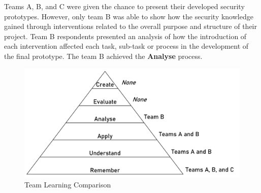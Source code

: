 \documentclass[runningheads]{llncs}
\begin{document}
Teams A, B, and C were given the chance to present their developed security prototypes. However, only team B was able to show how the security knowledge gained through interventions related to the overall purpose and structure of their project. Team B respondents presented an analysis of how the introduction of each intervention affected each task, sub-task or process in the development of the final prototype. The team B achieved the \textbf{Analyse} process. 

\begin{figure}[h]
  \centering
  \includegraphics[width=1\linewidth]{Bloomsoutput.pdf}
  \caption{Team Learning Comparison} \label{tab:bloomteamcomp} 
\end{figure}
\end{document}
